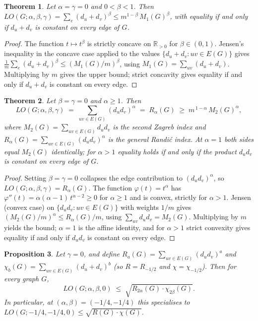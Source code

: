 \documentclass[a5paper, 10pt]{article}
\theoremstyle{plain}
\newtheorem{theorem}{Theorem}
\newtheorem{proposition}[theorem]{Proposition}
\theoremstyle{remark}
\theoremstyle{definition}
\newcommand{\Wuzi}{LO(G;\alpha,\beta,\gamma)}
\begin{document}
  \begin{theorem}\label{thm:m1_concave}
  Let $\alpha = \gamma = 0$ and $0 < \beta < 1$. Then
  $\Wuzi = \sum_e (d_u + d_v)^{\beta} \le m^{1 - \beta}\, M_1(G)^{\beta}$,
  with equality if and only if $d_u + d_v$ is constant on every
  edge of $G$.
  \end{theorem}

  \begin{proof}
  The function $t \mapsto t^{\beta}$ is strictly concave on
  $\mathbb{R}_{> 0}$ for $\beta \in (0, 1)$. Jensen's inequality in
  the concave case applied to the values $\{d_u + d_v : uv \in E(G)\}$
  gives $\frac{1}{m} \sum_e (d_u + d_v)^{\beta} \le ( M_1(G) / m )^{\beta}$,
  using $M_1(G) = \sum_{uv} (d_u + d_v)$. Multiplying by $m$ gives
  the upper bound; strict concavity gives equality if and only if
  $d_u + d_v$ is constant on every edge.
  \end{proof}

  \begin{theorem}\label{thm:m2_alpha}
  Let $\beta = \gamma = 0$ and $\alpha \ge 1$. Then
  \[
  \Wuzi
  \;=\; \sum_{uv \in E(G)} (d_u d_v)^{\alpha}
  \;=\; R_{\alpha}(G)
  \;\ge\; m^{\,1 - \alpha}\, M_2(G)^{\alpha},
  \]
  where $M_2(G) = \sum_{uv \in E(G)} d_u d_v$ is the second Zagreb
  index and $R_{\alpha}(G) = \sum_{uv \in E(G)} (d_u d_v)^{\alpha}$
  is the general Randi\'c index. At $\alpha = 1$ both sides equal
  $M_2(G)$ identically; for $\alpha > 1$ equality holds if and only
  if the product $d_u d_v$ is constant on every edge of $G$.
  \end{theorem}

  \begin{proof}
  Setting $\beta = \gamma = 0$ collapses the edge contribution to
  $(d_u d_v)^{\alpha}$, so $\Wuzi = R_{\alpha}(G)$. The function
  $\varphi(t) = t^{\alpha}$ has
  $\varphi''(t) = \alpha(\alpha - 1)\, t^{\alpha - 2} \ge 0$ for
  $\alpha \ge 1$ and is convex, strictly for $\alpha > 1$. Jensen
  (convex case) on $\{d_u d_v : uv \in E(G)\}$ with weights $1/m$
  gives $(M_2(G)/m)^{\alpha} \le R_{\alpha}(G)/m$, using
  $\sum_{uv} d_u d_v = M_2(G)$. Multiplying by $m$ yields the bound;
  $\alpha = 1$ is the affine identity, and for $\alpha > 1$ strict
  convexity gives equality if and only if $d_u d_v$ is constant on
  every edge.
  \end{proof}

  \begin{proposition}\label{thm:R_chi}
  Let $\gamma = 0$, and define
  $R_a(G) = \sum_{uv \in E(G)} (d_u d_v)^{a}$ and
  $\chi_b(G) = \sum_{uv \in E(G)} (d_u + d_v)^{b}$ (so $R = R_{-1/2}$
  and $\chi = \chi_{-1/2}$). Then for every graph $G$,
  \begin{equation}\label{eq:R_chi_bound}
  LO(G; \alpha, \beta, 0)
  \;\le\; \sqrt{R_{2\alpha}(G) \cdot \chi_{2\beta}(G)}.
  \end{equation}
  In particular, at $(\alpha, \beta) = (-1/4, -1/4)$ this
  specialises to $LO(G; -1/4, -1/4, 0) \le \sqrt{R(G) \cdot \chi(G)}$.
  \end{proposition}
\end{document}

